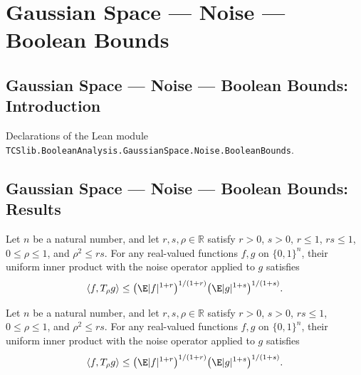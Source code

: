 \section{Gaussian Space --- Noise --- Boolean Bounds}
\subsection*{Gaussian Space --- Noise --- Boolean Bounds: Introduction}

Declarations of the Lean module \texttt{TCSlib.BooleanAnalysis.GaussianSpace.Noise.BooleanBounds}.

\subsection*{Gaussian Space --- Noise --- Boolean Bounds: Results}

\begin{lemma}
\label{BooleanAnalysis.GaussianSpace.boolean_two_function_smallOffset}
\leanok
{}
Let $n$ be a natural number, and let $r,s,\rho\in\mathbb R$ satisfy $r>0$, $s>0$,
$r\le1$, $rs\le1$, $0\le\rho\le1$, and $\rho^2\le rs$. For any real-valued functions
$f,g$ on $\{0,1\}^n$, their uniform inner product with the noise operator applied to $g$
satisfies
\[
\langle f,T_\rho g\rangle\le
\bigl(\E|f|^{1+r}\bigr)^{1/(1+r)}\bigl(\E|g|^{1+s}\bigr)^{1/(1+s)}.
\]
\end{lemma}

\begin{lemma}
\label{BooleanAnalysis.GaussianSpace.boolean_two_function_positiveOffsets}
\leanok
{}
Let $n$ be a natural number, and let $r,s,\rho\in\mathbb R$ satisfy $r>0$, $s>0$,
$rs\le1$, $0\le\rho\le1$, and $\rho^2\le rs$. For any real-valued functions $f,g$ on
$\{0,1\}^n$, their uniform inner product with the noise operator applied to $g$
satisfies
\[
\langle f,T_\rho g\rangle\le
\bigl(\E|f|^{1+r}\bigr)^{1/(1+r)}\bigl(\E|g|^{1+s}\bigr)^{1/(1+s)}.
\]
\end{lemma}
